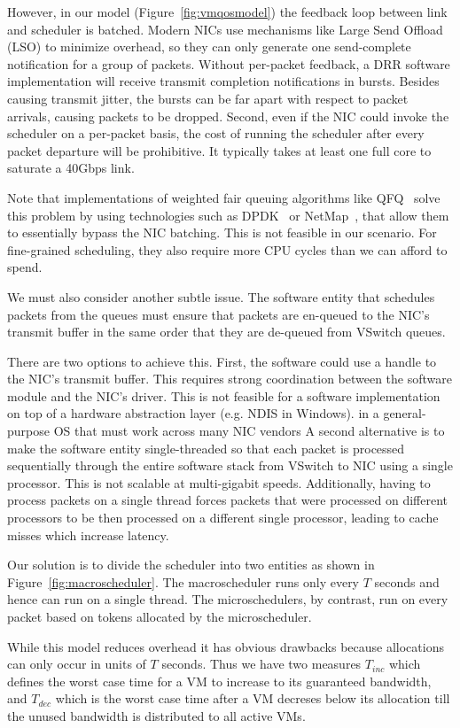 However, in our model  (Figure~\ref{fig:vmqosmodel}) the feedback loop between
link and scheduler is batched.  Modern NICs use mechanisms like Large Send
Offload (LSO) to minimize overhead, so they can only generate one send-complete
notification for a group of packets.  Without per-packet feedback, a DRR
software implementation will receive transmit completion notifications in
bursts.  Besides causing transmit jitter, the bursts can be far apart with
respect to packet arrivals, causing packets to be dropped. Second, even if the
NIC could invoke the scheduler on a per-packet basis, the cost of running the
scheduler after every packet departure will be prohibitive. It typically takes
at least one full core to saturate a 40Gbps link. 

Note that implementations of weighted fair queuing algorithms like
QFQ~\cite{qfq} solve this problem by using technologies such as DPDK~\cite{dpdk}
or NetMap~\cite{netmap}, that allow them to essentially bypass the NIC batching.
This is not feasible in our scenario. For fine-grained scheduling, they also
require more CPU cycles than we can afford to spend.
 
We must also consider another subtle issue.  The software entity that
schedules packets from the queues must ensure that packets are en-queued to the
NIC's transmit buffer in the same order that they are de-queued from VSwitch
queues.  

There are two options to achieve this. First, the software could use a handle to
the NIC's transmit buffer.  This requires strong coordination between the
software module and the NIC's driver.  This is not feasible for a software
implementation on top of a hardware abstraction layer (e.g. NDIS in Windows).
in a general-purpose OS that must work across many NIC vendors A second
alternative is to make the software entity single-threaded so that each packet
is processed sequentially through the entire software stack from VSwitch to NIC
using a single processor. This is not scalable at multi-gigabit speeds.
Additionally, having to process packets on a single thread forces packets that
were processed on different processors to be then processed on a different
single processor, leading to cache misses which increase latency.

Our solution is to divide the scheduler into two entities as shown in
Figure~\ref{fig:macroscheduler}.   The macroscheduler runs only every $T$
seconds and hence can run on a single thread.   The microschedulers, by
contrast, run on every packet based on tokens allocated by the microscheduler.   

While this model reduces overhead it has obvious drawbacks because allocations
can only occur in units of $T$ seconds.   Thus we have two measures $T_{inc}$
which defines the worst case time for a VM to increase to its guaranteed
bandwidth, and $T_{dec}$ which is the worst case time after a VM decreses below
its allocation till the unused bandwidth is distributed to all active VMs. 
